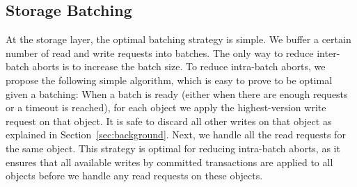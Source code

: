 \subsection{Storage Batching}
At the storage layer, the optimal batching strategy is simple. We buffer a certain number of read and write requests into batches. The only way to reduce inter-batch aborts is to increase the batch size. To reduce intra-batch aborts, we propose the following simple algorithm, which is easy to prove to be optimal given a batching:  When a batch is ready (either when there are enough requests or a timeout is reached), for each object we apply the highest-version write request on that object. It is safe to discard all other writes on that object as explained in Section~\ref{sec:background}. Next, we handle all the read requests for the same object. This strategy is optimal for reducing intra-batch aborts, as it ensures that all available writes by committed transactions are applied to all objects before we handle any read requests on these objects. 





